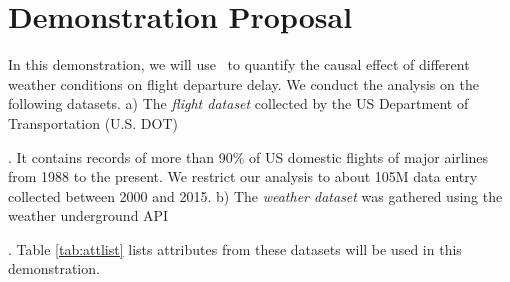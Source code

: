 \section{Demonstration Proposal}
\label{sec:dd}
 In this demonstration, we will use \GSQL\ to quantify the causal effect of 
 different weather conditions on flight departure delay. We conduct the analysis on the following datasets. a)  The {\em flight dataset} collected by the US
Department of Transportation (U.S. DOT) . It contains
records of more than 90\% of US domestic flights of major airlines
from 1988 to the present. We restrict our analysis to about 105M data entry
collected between 2000 and 2015. b) The {\em weather dataset} was gathered using the weather underground API .  Table \ref{tab:attlist} lists attributes from these datasets  will be used in this demonstration.
 
 
 
